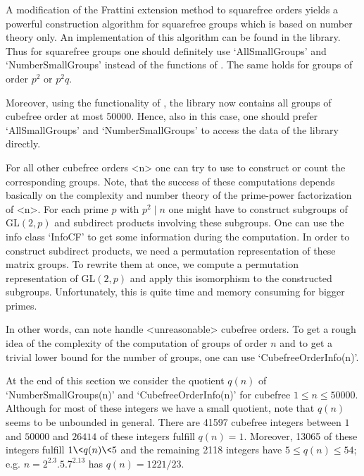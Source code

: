 A modification of the Frattini extension method to squarefree orders yields a
powerful 
construction algorithm for squarefree groups which is based on number theory
only. An implementation of this algorithm can be found
in the {\SmallGroups} library. Thus for squarefree
groups one should definitely use `AllSmallGroups' and `NumberSmallGroups'
instead of the functions of {\Cubefree}. The same holds for groups of order
$p^2$ or $p^2q$.

Moreover, using the functionality of {\Cubefree}, the {\SmallGroups} library now
contains all groups of cubefree order at most 50000. Hence, also in this case,
one should prefer `AllSmallGroups' and `NumberSmallGroups' to access the data
of the library directly.

For all other cubefree  orders <n> one can try to use
{\Cubefree} to construct or count the corresponding groups. Note, that the
success of these computations depends basically on the complexity and number
theory of the
prime-power factorization of <n>. For each prime $p$ with $p^2\mid n$ one
might have to construct subgroups of GL$(2,p)$ and subdirect products
involving these subgroups. One can use the info class `InfoCF' to get some
information during the computation. 
In order to construct subdirect products, we need a permutation representation of these
matrix groups. To rewrite them at once, we compute a
permutation representation of GL$(2,p)$ and apply this isomorphism to the
constructed subgroups. Unfortunately, this is quite time and memory consuming
for bigger primes.

In other words,  {\Cubefree} can note handle <unreasonable>
cubefree orders. To get a rough idea of the complexity of the computation of
groups of order $n$ and to get a trivial  lower bound for the number of
groups, one can use `CubefreeOrderInfo(n)'.

At the end of this section we consider the quotient $q(n)$ of `NumberSmallGroups(n)'
and  `CubefreeOrderInfo(n)' for cubefree $1\leq n\leq
50000$. Although for most of these integers we have a small quotient, note
that $q(n)$ seems to be unbounded in general. There are 41597 cubefree integers between $1$ and $50000$ and $26414$
of these integers fulfill $q(n)=1$. Moreover, 13065 of these integers fulfill
$1\< q(n)\< 5$ and the remaining 2118 integers have $5\leq q(n)\leq
54$; e.g. $n=2^2.3.5.7^2.13$ has $q(n)=1221/23$. 










